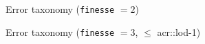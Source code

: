 \documentclass[10pt, export]{beamer}
\begin{document}
            \begin{frame}{Error taxonomy (\texttt{finesse} $= 2$)}
            \end{frame}
            \begin{frame}{Error taxonomy (\texttt{finesse} $= 3$, $\leq$ \acrshort{acr::lod}-1)}
                \begin{figure}
                    
                \end{figure}
            \end{frame}
\end{document}
